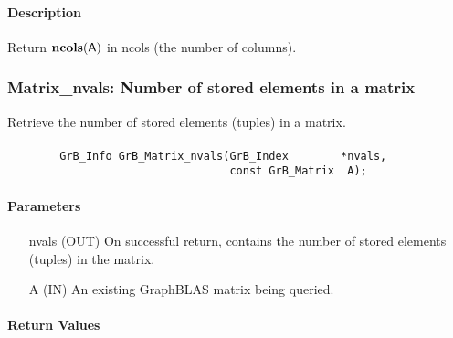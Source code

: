 \paragraph{Description}

Return $\mathbf{ncols}({\sf A})$ in {\sf ncols} (the number of columns).

\subsubsection{{\sf Matrix\_nvals}: Number of stored elements in a matrix}
\label{Sec:Matrix_nvals}

Retrieve the number of stored elements (tuples) in a matrix.

\paragraph{\syntax}

\begin{verbatim}
        GrB_Info GrB_Matrix_nvals(GrB_Index        *nvals,
                                  const GrB_Matrix  A);
\end{verbatim}

\paragraph{Parameters}

\begin{itemize}[leftmargin=1.1in]
    \item[{\sf nvals}] ({\sf OUT}) On successful return, contains the number of 
    stored elements (tuples) in the matrix.
    \item[{\sf A}] ({\sf IN}) An existing GraphBLAS matrix being queried.
\end{itemize}

\paragraph{Return Values}

